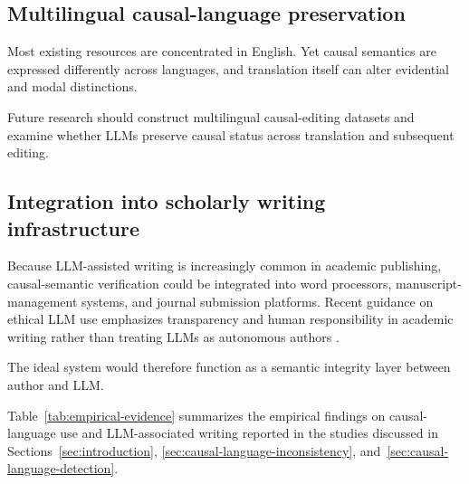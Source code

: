 \documentclass[11pt]{article}
\begin{document}
\subsection{Multilingual causal-language preservation}

Most existing resources are concentrated in English. Yet causal semantics are expressed differently across languages, and translation itself can alter evidential and modal distinctions.

Future research should construct multilingual causal-editing datasets and examine whether LLMs preserve causal status across translation and subsequent editing.

\subsection{Integration into scholarly writing infrastructure}

Because LLM-assisted writing is increasingly common in academic publishing, causal-semantic verification could be integrated into word processors, manuscript-management systems, and journal submission platforms. Recent guidance on ethical LLM use emphasizes transparency and human responsibility in academic writing rather than treating LLMs as autonomous authors \cite{porsdammann2024}.

The ideal system would therefore function as a semantic integrity layer between author and LLM.

Table~\ref{tab:empirical-evidence} summarizes the empirical findings on causal-language use and LLM-associated writing reported in the studies discussed in Sections~\ref{sec:introduction}, \ref{sec:causal-language-inconsistency}, and~\ref{sec:causal-language-detection}.
\end{document}
